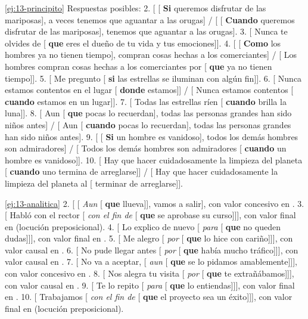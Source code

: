 \begin{solucion}{\ref{ej:13-principito}}
Respuestas posibles: 2. [ [ \textbf{Si} queremos disfrutar de
las mariposas], a veces tenemos que aguantar a las orugas] / [
[ \textbf{Cuando} queremos disfrutar de las mariposas], tenemos que
aguantar a las orugas]. 3. [ Nunca te olvides de [
\textbf{que} eres el dueño de tu vida y tus emociones]]. 4. [
[ \textbf{Como} los hombres ya no tienen tiempo], compran cosas hechas a
los comerciantes] / [ Los hombres compran cosas hechas a los
comerciantes por [ \textbf{que} ya no tienen tiempo]]. 5. [
Me pregunto [ \textbf{si} las estrellas se iluminan con algún fin]]. 6.
[ Nunca estamos contentos en el lugar [ \textbf{donde}
estamos]] / [ Nunca estamos contentos [ \textbf{cuando}
estamos en un lugar]]. 7. [ Todas las estrellas ríen [
\textbf{cuando} brilla la luna]]. 8. [ Aun [ \textbf{que}
pocas lo recuerdan], todas las personas grandes han sido niños antes] /
[ Aun [ \textbf{cuando} pocas lo recuerdan], todas las
personas grandes han sido niños antes]. 9. [ [ \textbf{Si} un
hombre es vanidoso], todos los demás hombres son admiradores] / [
Todos los demás hombres son admiradores [ \textbf{cuando} un hombre es
vanidoso]]. 10. [ Hay que hacer cuidadosamente la limpieza del
planeta [ \textbf{cuando} uno termina de arreglarse]] / [ Hay
que hacer cuidadosamente la limpieza del planeta al [ terminar de
arreglarse]].
\end{solucion}

\begin{solucion}{\ref{ej:13-analitica}}
2. [ [ \textit{Aun} [ \textbf{que} llueva]], vamos a
salir], con valor concesivo en . 3. [ Habló con el rector
[ \textit{con el fin de} [ \textbf{que} se aprobase su curso]]],
con valor final en  (locución preposicional). 4.
[ Lo explico de nuevo [ \textit{para} [ \textbf{que}
no queden dudas]]], con valor final en . 5. [ Me alegro
[ \textit{por} [ \textbf{que} lo hice con cariño]]], con valor
causal en . 6. [ No pude llegar antes [
\textit{por} [ \textbf{que} había mucho tráfico]]], con valor causal en
. 7. [ No va a aceptar, [ \textit{aun} [
\textbf{que} se lo pidamos amablemente]]], con valor concesivo en . 8.
[ Nos alegra tu visita [ \textit{por} [ \textbf{que}
te extrañábamos]]], con valor causal en . 9. [ Te lo
repito [ \textit{para} [ \textbf{que} lo entiendas]]], con valor
final en . 10. [ Trabajamos [ \textit{con el fin
de} [ \textbf{que} el proyecto sea un éxito]]], con valor final en
 (locución preposicional).
\end{solucion}

